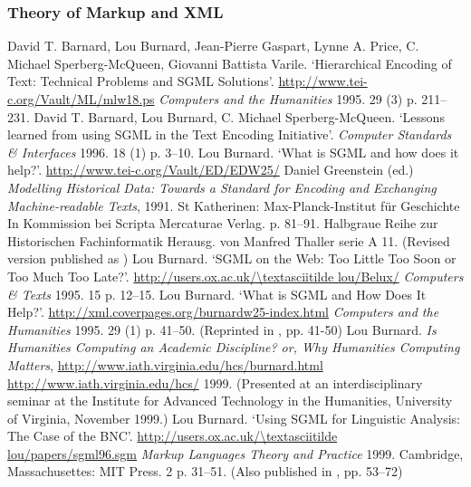 \subsubsection[{Theory of Markup and XML}]{Theory of Markup and XML}\begin{bibitemlist}{1}
\label{Barnardetal1995}David T. Barnard, Lou Burnard, Jean-Pierre Gaspart, Lynne A. Price, C. Michael Sperberg-McQueen, Giovanni Battista Varile. ‘Hierarchical Encoding of Text: Technical Problems and SGML Solutions’.   \url{http://www.tei-c.org/Vault/ML/mlw18.ps} \textit{Computers and the Humanities} 1995. 29  (3)  p. 211–231. 
\label{Barnardetal1996}David T. Barnard, Lou Burnard, C. Michael Sperberg-McQueen. ‘Lessons learned from using SGML in the Text Encoding Initiative’.  \textit{Computer Standards \& Interfaces} 1996. 18  (1)  p. 3–10. 
\label{Burnard1991}Lou Burnard. ‘What is SGML and how does it help?’.  \url{http://www.tei-c.org/Vault/ED/EDW25/} Daniel Greenstein (ed.) \textit{Modelling Historical Data: Towards a Standard for Encoding and Exchanging Machine-readable Texts}, 1991. St Katherinen: Max-Planck-Institut für Geschichte In Kommission bei Scripta Mercaturae Verlag. p. 81–91. Halbgraue Reihe zur Historischen Fachinformatik  Herausg. von Manfred Thaller serie A  11.  (Revised version published as \cite{Burnard1995a})
\label{Burnard1995a}Lou Burnard. ‘SGML on the Web: Too Little Too Soon or Too Much Too Late?’.  \url{http://users.ox.ac.uk/\textasciitilde lou/Belux/} \textit{Computers \& Texts} 1995. 15 p. 12–15. 
\label{Burnard1995c}Lou Burnard. ‘What is SGML and How Does It Help?’.   \url{http://xml.coverpages.org/burnardw25-index.html} \textit{Computers and the Humanities} 1995. 29  (1)  p. 41–50.  (Reprinted in \cite{Ide1995b}, pp. 41-50)
\label{Burnard1999a}Lou Burnard. \textit{Is Humanities Computing an Academic Discipline? or, Why Humanities Computing Matters},  \url{http://www.iath.virginia.edu/hcs/burnard.html}  \url{http://www.iath.virginia.edu/hcs/} 1999.  (Presented at an interdisciplinary seminar at the Institute for Advanced Technology in the Humanities, University of Virginia, November 1999.)
\label{Burnard1999b}Lou Burnard. ‘Using SGML for Linguistic Analysis: The Case of the BNC’.  \url{http://users.ox.ac.uk/\textasciitilde lou/papers/sgml96.sgm} \textit{Markup Languages Theory and Practice} 1999. Cambridge, Massachusettes: MIT Press. 2 p. 31–51.  (Also published in \cite{Moser2001a}, pp. 53–72)

\end{bibitemlist}
